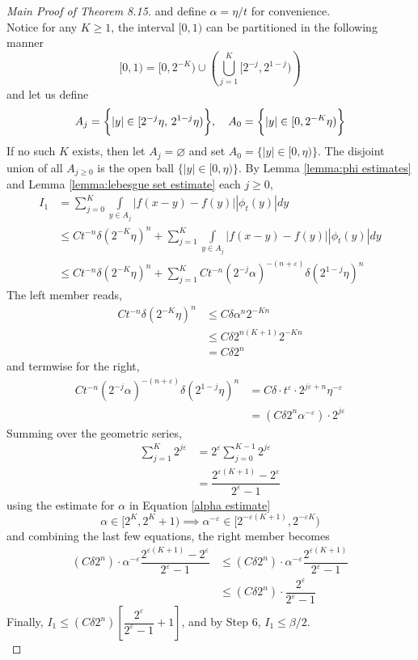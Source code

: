 \documentclass[../../main.tex]{subfiles}
\begin{document}
\begin{proof}[Main Proof of Theorem 8.15]
    and define $\alpha = \eta/t$ for convenience.\\

    Notice for any $K\geq 1$, the interval $[0,1)$ can be partitioned in the following manner\[[0,1)=[0,2^{-K})\cup\left(\bigcup\limits_{j=1}^K[2^{-j},2^{1-j})\right)\]
    and let us define 
    \[A_j = \biggl\{{|y|\in[2^{-j}\eta,\,2^{1-j}\eta)}\biggr\},\quad A_0 = \biggl\{{|y|\in[0,2^{-K}\eta)}\biggr\}\]
    If no such $K$ exists, then let $A_j=\varnothing$ and set $A_0 = \{|y|\in[0,\eta)\}$. The disjoint union of all $A_{j\geq 0}$ is the open ball $\{|y|\in[0,\eta)\}$. By Lemma \ref{lemma:phi estimates} and Lemma \ref{lemma:lebesgue set estimate} each $j\geq 0$,
    \begin{align*}
        I_1&= \sum_{j=0}^K\int\limits_{y\in A_j}|f(x-y)-f(y)||\phi_t(y)|dy\\[2ex]
        &\leq Ct^{-n}\delta(2^{-K}\eta)^n + \sum_{j=1}^K\int\limits_{y\in A_j}|f(x-y)-f(y)||\phi_t(y)|dy\\[2ex]
        &\leq Ct^{-n}\delta(2^{-K}\eta)^n + \sum_{j=1}^K Ct^{-n}(2^{-j}\alpha)^{-(n+\varepsilon)}\delta(2^{1-j}\eta)^n
    \end{align*}
    The left member reads, 
    \begin{align*}
        Ct^{-n}\delta(2^{-K}\eta)^n&\leq C\delta\alpha^n2^{-Kn}\\
        &\leq C\delta 2^{n(K+1)}2^{-Kn}\\
        &=C\delta 2^n
    \end{align*}
    and termwise for the right,
    \begin{align*}
        Ct^{-n}(2^{-j}\alpha)^{-(n+\varepsilon)}\delta(2^{1-j}\eta)^n &= C\delta\cdot t^{\varepsilon}\cdot 2^{j\varepsilon+n}\eta^{-\varepsilon}\\
        &= (C\delta 2^n\alpha^{-\varepsilon})\cdot 2^{j\varepsilon}
    \end{align*}
    Summing over the geometric series,
    \begin{align*}
        \sum_{j=1}^K2^{j\varepsilon}&=2^{\varepsilon}\sum^{K-1}_{j=0}2^{j\varepsilon}\\[2ex]
        &=\dfrac{2^{\varepsilon(K+1)}-2^{\varepsilon}}{2^{\varepsilon}-1}
    \end{align*}
    using the estimate for $\alpha$ in Equation \eqref{alpha estimate} 
    \[\alpha\in [2^K,2^K+1)\implies\alpha^{-\varepsilon}\in[2^{-\varepsilon(K+1)},2^{-\varepsilon K})\]
    and combining the last few equations, the right member becomes
    \begin{align*}
        (C\delta 2^n)\cdot \alpha^{-\varepsilon}\dfrac{2^{\varepsilon(K+1)}-2^{\varepsilon}}{2^{\varepsilon}-1}&\leq (C\delta 2^n)\cdot \alpha^{-\varepsilon}\dfrac{2^{\varepsilon(K+1)}}{2^{\varepsilon}-1}\\[2ex]
        &\leq (C\delta 2^n)\cdot \dfrac{2^{\varepsilon}}{2^{\varepsilon}-1}
    \end{align*}
    Finally, $I_1\leq (C\delta 2^n)\left[\dfrac{2^\varepsilon}{2^\varepsilon-1}+1\right]$, and by Step 6, $I_1\leq \beta/2$.\\


\end{proof}
\end{document}
